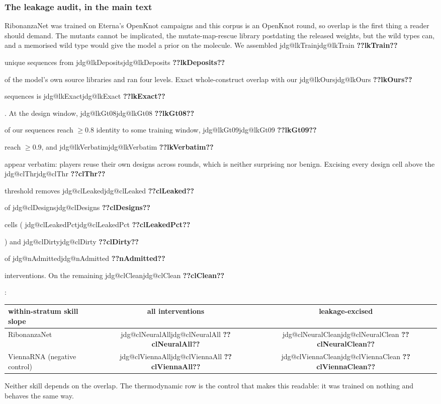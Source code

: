 \documentclass[11pt]{article}
\makeatletter
\newcommand{\jdg}[1]{%
  \ifcsname jdg@#1\endcsname\csname jdg@#1\endcsname
  \else\textbf{??#1??}\PackageError{nm}{undefined measured quantity #1}{}\fi}
\makeatother
\begin{document}
\subsubsection{The leakage audit, in the main text}
\label{sec:leakage}

RibonanzaNet was trained on Eterna's OpenKnot campaigns and this corpus is an OpenKnot round, so
overlap is the first thing a reader should demand. The mutants cannot be implicated, the mutate-map-rescue library postdating the released weights,
but the wild types can, and a memorised wild type would give the model a prior on the molecule. We
assembled \jdg{lkTrain} unique sequences from \jdg{lkDeposits} of the model's own source libraries
and ran four levels. Exact whole-construct overlap with our \jdg{lkOurs} sequences is
\jdg{lkExact}. At the design window, \jdg{lkGt08} of our sequences reach $\ge0.8$ identity to some
training window, \jdg{lkGt09} reach $\ge0.9$, and \jdg{lkVerbatim} appear verbatim: players
reuse their own designs across rounds, which is neither surprising nor benign. Excising every
design cell above the \jdg{clThr} threshold removes \jdg{clLeaked} of \jdg{clDesigns} cells
(\jdg{clLeakedPct}) and \jdg{clDirty} of \jdg{nAdmitted} interventions. On the remaining
\jdg{clClean}:

\begin{center}
\begin{tabular}{lcc}
\toprule
within-stratum skill slope & all interventions & leakage-excised \\
\midrule
RibonanzaNet & \jdg{clNeuralAll} & \jdg{clNeuralClean} \\
ViennaRNA (negative control) & \jdg{clViennaAll} & \jdg{clViennaClean} \\
\bottomrule
\end{tabular}
\end{center}

Neither skill depends on the overlap. The thermodynamic row is the control that makes this
readable: it was trained on nothing and behaves the same way.
\end{document}
